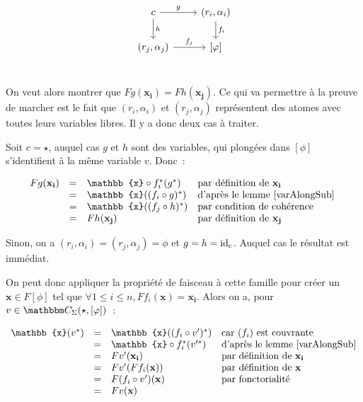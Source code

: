 \begin{pv}
    \[\begin{tikzcd}
        c \arrow[r, "g"] \arrow[d, "h"] & (r_i,\alpha_i) \arrow[d, "f_i"] \\
          (r_j,\alpha_j) \arrow[r, "f_j"] & \brk{\phi} \\
    \end{tikzcd}\]

    On veut alors montrer que $Fg(\mathbf{x_i}) = Fh(\mathbf{x_j})$. Ce qui va
    permettre à la preuve de marcher est le fait que $(r_i,\alpha_i)$ et
    $(r_j,\alpha_j)$ représentent des atomes avec toutes leurs variables
    libres. Il y a donc deux cas à traiter.

    Soit $c = \star$, auquel cas $g$ et $h$ sont des variables, qui plongées dans 
    $[\phi]$ s'identifient à la même variable $v$. Donc~:
    
    \[\begin{array}{rcll}
        Fg(\mathbf{x_i}) & = & \mathbb{x}\circ f_i^*(g^*)
                             & \text{par définition de } \mathbf{x_i} \\
                         & = & \mathbb{x}((f_i\circ g)^*)
                             & \text{d'après le lemme \ref{varAlongSub} } \\
                         & = & \mathbb{x}((f_j\circ h)^*)
                             & \text{par condition de cohérence} \\
                         & = & Fh(\mathbf{x_j})
                             & \text{par définition de } \mathbf{x_j} \\
    \end{array}\]

    Sinon, on a $(r_i,\alpha_i) = (r_j,\alpha_j) = \phi$ et $g = h = \operatorname{id}_c$. Auquel cas le
    résultat est immédiat.

    On peut donc appliquer la propriété de faisceau à cette famille pour créer un
    $\mathbf{x}\in F[\phi]$ tel que
    $\forall 1\leq i\leq n, Ff_i(\mathbf{x}) = \mathbf{x_i}$. Alors on a, pour
    $v\in\C_\Sigma(\star,[\phi])$~:

    \[\begin{array}{rcll}
        \mathbb{x}(v^*) & = & \mathbb{x}((f_i\circ v')^*)
                                & \text{car $(f_i)$ est couvrante} \\
                        & = & \mathbb{x}\circ f_i^*(v'^*)
                                & \text{d'après le lemme \ref{varAlongSub}} \\
                        & = & Fv'(\mathbf{x_i})
                                & \text{par définition de }\mathbf{x_i}\\
                        & = & Fv'(Ff_i(\mathbf{x}))
                                & \text{par définition de }\mathbf{x} \\
                        & = & F(f_i\circ v')(\mathbf{x})
                                & \text{par fonctorialité} \\
                        & = & Fv(\mathbf{x}) & \\
    \end{array}\]


\end{pv}
